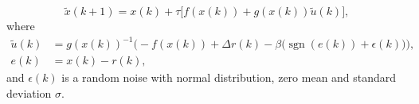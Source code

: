 \begin{equation}
	\label{eq:attacked_system}
	\tilde{x}(k+1) = x(k) + \tau \bigl[ f(x(k)) + g(x(k)) \tilde{u}(k) \bigr],
\end{equation}
\noindent where
\begin{align*}
	\tilde{u}(k) & = g(x(k))^{-1} \bigl(-f(x(k)) + \Delta r(k) - \beta \bigl(\operatorname{sgn}(e(k)) + \epsilon(k)\bigr)\bigr), \\
	e(k)         & = x(k) - r(k),
\end{align*}
and $\epsilon(k)$ is a random noise with normal distribution,
zero mean and standard deviation $\sigma$.
